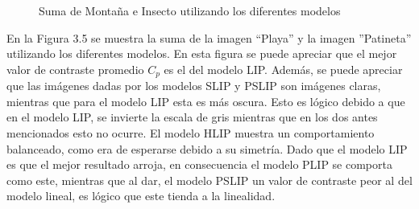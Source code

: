 \begin{figure}
\begin{center}
		\caption{Suma de Monta\~na e Insecto utilizando los diferentes modelos}
	\end{center}
\end{figure}

En la Figura 3.5 se muestra la suma de la imagen ``Playa'' y la imagen ''Patineta'' utilizando los diferentes modelos. En esta figura se puede apreciar que el mejor valor de contraste promedio $C_p$ es el del modelo LIP. Adem\'as, se puede apreciar que las im\'agenes dadas por los modelos SLIP y PSLIP son im\'agenes claras, mientras que para el modelo LIP esta es m\'as oscura. Esto es l\'ogico debido a que en el modelo LIP, se invierte la escala de gris mientras que en los dos antes mencionados esto no ocurre. El modelo HLIP muestra un comportamiento balanceado, como era de esperarse debido a su simetr\'ia. Dado que el modelo LIP es que el mejor resultado arroja, en consecuencia el modelo PLIP se comporta como este, mientras que al dar, el modelo PSLIP un valor de contraste peor al del modelo lineal, es l\'ogico que este tienda a la linealidad.

